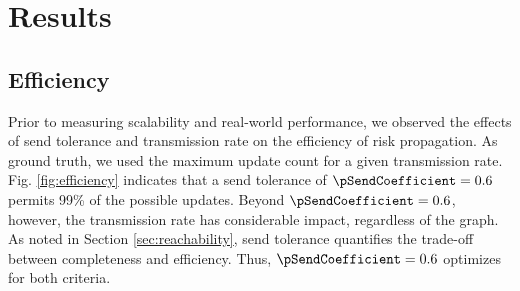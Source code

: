 \section{Results}
\subsection{Efficiency}

Prior to measuring scalability and real-world performance, we observed the effects of send tolerance and transmission rate on the efficiency of risk propagation. As ground truth, we used the maximum update count for a given transmission rate. Fig. \ref{fig:efficiency} indicates that a send tolerance of $\pSendCoefficient = 0.6$ permits 99\% of the possible updates. Beyond $\pSendCoefficient = 0.6$, however, the transmission rate has considerable impact, regardless of the graph. As noted in Section \ref{sec:reachability}, send tolerance quantifies the trade-off between completeness and efficiency. Thus, $\pSendCoefficient = 0.6$ optimizes for both criteria.

